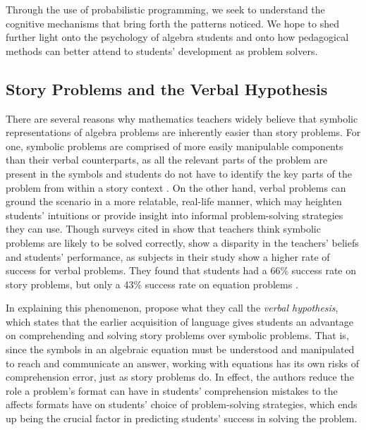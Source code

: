 \documentclass[10pt,letterpaper]{article}
\begin{document}
Through the use of probabilistic programming, we seek to understand the cognitive mechanisms that bring forth the patterns  noticed. We hope to shed further light onto the psychology of algebra students and onto how pedagogical methods can better attend to students' development as problem solvers.


\subsection{Story Problems and the Verbal Hypothesis}

There are several reasons why mathematics teachers widely believe that symbolic representations of algebra problems are inherently easier than story problems. For one, symbolic problems are comprised of more easily manipulable components than their verbal counterparts, as all the relevant parts of the problem are present in the symbols and students do not have to identify the key parts of the problem from within a story context \cite{KoedNath2004}. On the other hand, verbal problems can ground the scenario in a more relatable, real-life manner, which may heighten students’ intuitions or provide insight into informal problem-solving strategies they can use. Though surveys cited in \cite{Nathan2012} show that teachers think symbolic problems are likely to be solved correctly,  show a disparity in the teachers' beliefs and students' performance, as subjects in their study show a higher rate of success for verbal problems. They found that students had a 66\% success rate on story problems, but only a 43\% success rate on equation problems \cite{KoedNath2004}.

In explaining this phenomenon,  propose what they call the \textit{verbal hypothesis}, which states that the earlier acquisition of language gives students an advantage on comprehending and solving story problems over symbolic problems. That is, since the symbols in an algebraic equation must be understood and manipulated to reach and communicate an answer, working with equations has its own risks of comprehension error, just as story problems do. In effect, the authors reduce the role a problem's format can have in students' comprehension mistakes to the affects formats have on students' choice of problem-solving strategies, which ends up being the crucial factor in predicting students' success in solving the problem.
\end{document}
